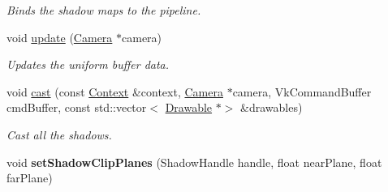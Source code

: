 \begin{DoxyCompactItemize}
\begin{DoxyCompactList}\small\item\em Binds the shadow maps to the pipeline. \end{DoxyCompactList}\item 
\mbox{\label{classblaze_1_1LightSystem_ab69f30e8484a49a116c8d5333f77b146}} 
void \hyperlink{classblaze_1_1LightSystem_ab69f30e8484a49a116c8d5333f77b146}{update} (\hyperlink{classblaze_1_1Camera}{Camera} $\ast$camera)
\begin{DoxyCompactList}\small\item\em Updates the uniform buffer data. \end{DoxyCompactList}\item 
void \hyperlink{classblaze_1_1LightSystem_aabd6e6a8cb4d4633cebb885e184382fe}{cast} (const \hyperlink{classblaze_1_1Context}{Context} \&context, \hyperlink{classblaze_1_1Camera}{Camera} $\ast$camera, Vk\+Command\+Buffer cmd\+Buffer, const std\+::vector$<$ \hyperlink{classblaze_1_1Drawable}{Drawable} $\ast$$>$ \&drawables)
\begin{DoxyCompactList}\small\item\em Cast all the shadows. \end{DoxyCompactList}\item 
\mbox{\label{classblaze_1_1LightSystem_a8dede1ffbbc87e14b494f3660c828389}} 
void {\bfseries set\+Shadow\+Clip\+Planes} (Shadow\+Handle handle, float near\+Plane, float far\+Plane)
\end{DoxyCompactItemize}
